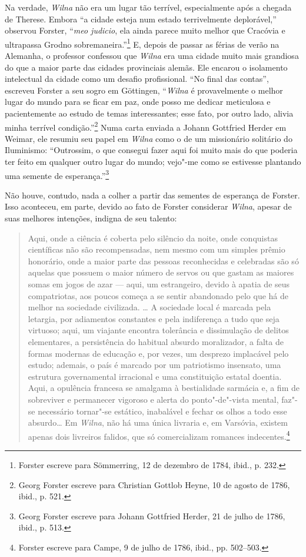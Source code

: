 Na verdade, \textit{Wilna} não era um lugar tão terrível, especialmente após a
chegada de Therese. Embora ``a cidade esteja num estado terrivelmente
deplorável,'' observou Forster, ``\textit{meo judicio}, ela ainda parece
muito melhor que Cracóvia e ultrapassa Grodno sobremaneira.''\footnote{Forster escreve para Sömmerring, 12 de dezembro de 1784, ibid., p. 232.} E, depois de passar as férias de verão na Alemanha, o professor confessou
que \textit{Wilna} era uma cidade muito mais grandiosa do que a maior parte das
cidades provinciais alemãs. Ele encarou o isolamento intelectual da
cidade como um desafio profissional. ``No final das contas'', escreveu
Forster a seu sogro em Göttingen, ``\textit{Wilna} é provavelmente o melhor lugar
do mundo para se ficar em paz, onde posso me dedicar meticulosa e
pacientemente ao estudo de temas interessantes; esse fato, por outro
lado, alivia minha terrível condição.''\footnote{Georg Forster escreve para Christian Gottlob Heyne, 10 de agosto de 1786, ibid., p. 521.} Numa carta enviada a Johann Gottfried Herder em Weimar, ele resumiu seu
papel em \textit{Wilna} como o de um missionário solitário do Iluminismo:
``Outrossim, o que consegui fazer aqui foi muito mais do que poderia ter
feito em qualquer outro lugar do mundo; vejo"-me como se estivesse
plantando uma semente de esperança.''\footnote{Georg Forster escreve para Johann Gottfried Herder, 21 de julho de 1786, ibid., p. 513.}

Não houve, contudo, nada a colher a partir das sementes de esperança de
Forster. Isso aconteceu, em parte, devido ao fato de Forster considerar
\textit{Wilna}, apesar de suas melhores intenções, indigna de seu talento:

\begin{quote}
Aqui, onde a ciência é coberta pelo silêncio da noite, onde conquistas
científicas não são recompensadas, nem mesmo com um simples prêmio
honorário, onde a maior parte das pessoas reconhecidas e celebradas são
só aquelas que possuem o maior número de servos ou que gastam as maiores
somas em jogos de azar --- aqui, um estrangeiro, devido à apatia de seus
compatriotas, aos poucos começa a se sentir abandonado pelo que há de
melhor na sociedade civilizada. \ldots{} A sociedade local é marcada
pela letargia, por adiamentos constantes e pela indiferença a tudo que
seja virtuoso; aqui, um viajante encontra tolerância e dissimulação de
delitos elementares, a persistência do habitual absurdo moralizador, a
falta de formas modernas de educação e, por vezes, um desprezo
implacável pelo estudo; ademais, o país é marcado por um patriotismo
insensato, uma estrutura governamental irracional e uma constituição
estatal doentia. Aqui, a opulência francesa se amalgama à bestialidade
sarmácia e, a fim de sobreviver e permanecer vigoroso e alerta do
ponto"-de"-vista mental, faz"-se necessário tornar"-se estático, inabalável
e fechar os olhos a todo esse absurdo\ldots{} Em \textit{Wilna}, não há uma única
livraria e, em Varsóvia, existem apenas dois livreiros falidos, que só
comercializam romances indecentes.\footnote{Forster escreve para Campe, 9 de julho de 1786, ibid., pp. 502--503.} 
\end{quote}

